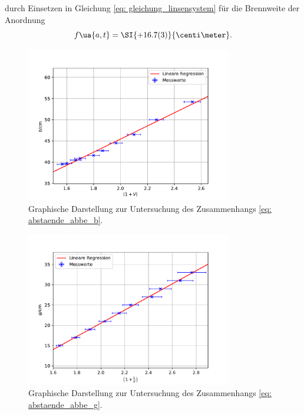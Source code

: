 durch Einsetzen in Gleichung \eqref{eq: gleichung_linsensystem} für die Brennweite der Anordnung
\begin{equation}
  f\ua{a, t} = \SI{+16.7(3)}{\centi\meter}.
\end{equation}
\begin{figure}
  \centering
  \includegraphics[width = 0.8\textwidth]{../Messdaten/plots/abbe_plot_b.pdf}
  \caption{Graphische Darstellung zur Untersuchung des Zusammenhangs \eqref{eq: abstaende_abbe_b}.}
  \label{fig: abbe_b}
\end{figure}
\begin{figure}
  \centering
  \includegraphics[width = 0.8\textwidth]{../Messdaten/plots/abbe_plot_g.pdf}
  \caption{Graphische Darstellung zur Untersuchung des Zusammenhangs \eqref{eq: abstaende_abbe_g}.} %
  \label{fig: abbe_g}
\end{figure}

